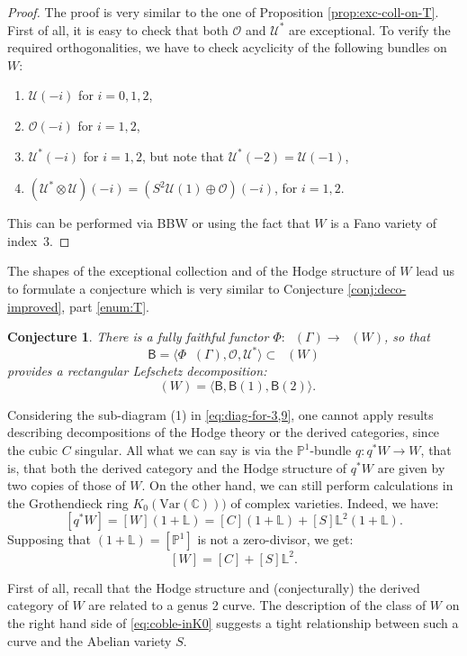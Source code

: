 \documentclass[JEP,XML,SOM,Unicode,NoEqCountersInSection]{cedram}
\newcommand{\Var}{\mathrm{Var}}
\let\mathcal\mathscr
\theoremstyle{plain}
\newtheorem{conjecture}[theorem]{Conjecture}
\theoremstyle{definition}
\newcommand{\cat}[1]{\mathsf{#1}}
\newcommand{\sod}[1]{\langle #1 \rangle}
\DeclareMathOperator{\Db}{{\cat{D}^{\mathrm{b}}}}
\newcommand{\CC}{\mathbb{C}}
\newcommand{\LL}{\mathbb{L}}
\newcommand{\PP}{\mathbb{P}}
\newcommand{\sheaf}[1]{\mathcal{#1}}
\newcommand{\ko}{\sheaf{O}}\let\OO\ko\let\cO\ko
\newcommand{\ku}{\sheaf{U}}
\begin{document}
\begin{proof}
The proof is very similar to the one of Proposition \ref{prop:exc-coll-on-T}. First of all, it is easy to check
that both $\ko$ and $\ku^*$ are exceptional. To verify the required orthogonalities, we have to check
acyclicity of the following bundles on $W$:
\begin{enumerate}
\item $\ku(-i)$ for $i=0,1,2$,
\item $\ko(-i)$ for $i=1,2$,
\item $\ku^*(-i)$ for $i=1,2$, but note that $\ku^*(-2)=\ku(-1)$,
\item $(\ku^* \otimes \ku)(-i) = (S^2 \ku(1) \oplus \ko)(-i)$, for $i=1,2$.
\end{enumerate}
This can be performed via BBW or using the fact that $W$ is a Fano variety of index~$3$.
\end{proof}
The shapes of the exceptional collection and of the Hodge structure of $W$ lead us to formulate
a conjecture which is very similar to Conjecture \ref{conj:deco-improved}, part \eqref{enum:T}.

\begin{conjecture}\label{conj:deco-for-T29}
There is a fully faithful functor $\Phi: \Db(\Gamma) \to \Db(W)$, so that
\[
\cat{B}=\sod{\Phi \Db(\Gamma),\ko,\ku^*} \subset \Db(W)
\]
provides a rectangular Lefschetz decomposition:
\[
\Db(W)=\sod{\cat{B},\cat{B}(1),\cat{B}(2)}.
\]
\end{conjecture}

Considering the sub-diagram (1) in \eqref{eq:diag-for-3,9}, one cannot apply results describing decom\-positions of the
Hodge theory or the derived categories, since the cubic $C$ singular. All what we can say is via the
$\PP^1$-bundle $q: q^* W \to W$, that is, that both the derived category and the Hodge structure of $q^*W$
are given by two copies of those of $W$. On the other hand, we can still perform calculations in the
Grothendieck ring $K_0(\Var(\CC)))$ of complex varieties. Indeed, we have:
\[
[q^*W] = [W](1+\LL) = [C](1+\LL) + [S]\LL^2 (1+\LL).
\]
Supposing that $(1+\LL) = [\PP^1]$ is not a zero-divisor, we get:
\begin{equation}\label{eq:coble-inK0}
[W] = [C] + [S]\LL^2.
\end{equation}

First of all, recall that the Hodge structure and (conjecturally) the derived category
of $W$ are related to a genus 2 curve. The description of the class of $W$ on the right hand
side of \eqref{eq:coble-inK0} suggests a tight relationship between such a curve and the Abelian
variety $S$.
\end{document}
